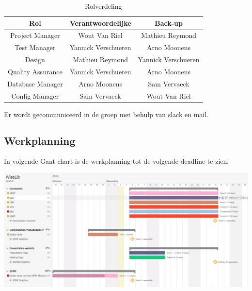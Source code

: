 \begin{table}[h]
\centering
\begin{tabular}{c|c|c}
\textbf{Rol} & \textbf{Verantwoordelijke} & \textbf{Back-up}  \\
\hline
 Project Manager & Wout Van Riel & Mathieu Reymond \\
 Test Manager & Yannick Verschueren & Arno Moonens \\
 Design & Mathieu Reymond & Yannick Verschueren \\
 Quality Assurance & Yannick Verschueren & Arno Moonens \\
 Database Manager & Arno Moonens & Sam Vervaeck \\
 Config Manager & Sam Vervaeck & Wout Van Riel 
\end{tabular}
\caption{Rolverdeling}
\label{tab:rolverdeling}
\end{table}

Er wordt gecommuniceerd in de groep met behulp van slack \cite{Slack} en mail. 

\subsection{Werkplanning}
In volgende Gant-chart is de werkplanning tot de volgende deadline te zien.
\newline

\includegraphics[width=\linewidth]{Gant_chart}
